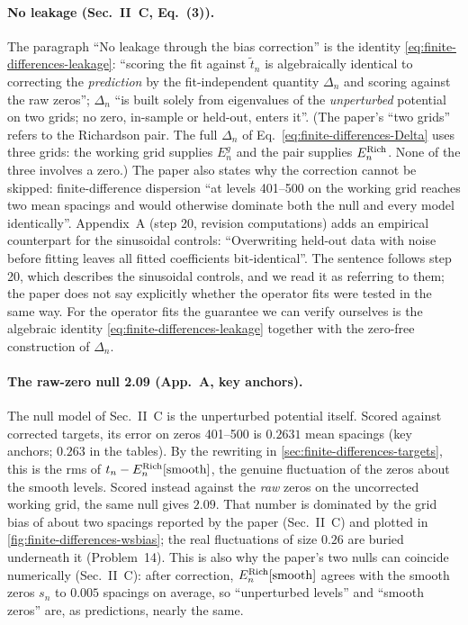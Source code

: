 \paragraph{No leakage (Sec.~II~C, Eq.~(3)).} The paragraph ``No leakage through the bias correction'' is the identity \eqref{eq:finite-differences-leakage}: ``scoring the fit against $\tilde t_n$ is algebraically identical to correcting the \emph{prediction} by the fit-independent quantity $\Delta_n$ and scoring against the raw zeros''; $\Delta_n$ ``is built solely from eigenvalues of the \emph{unperturbed} potential on two grids; no zero, in-sample or held-out, enters it''. (The paper's ``two grids'' refers to the Richardson pair. The full $\Delta_n$ of Eq.~\eqref{eq:finite-differences-Delta} uses three grids: the working grid supplies $E^g_n$ and the pair supplies $E^{\rm Rich}_n$. None of the three involves a zero.) The paper also states why the correction cannot be skipped: finite-difference dispersion ``at levels 401--500 on the working grid reaches two mean spacings and would otherwise dominate both the null and every model identically''. Appendix~A (step 20, revision computations) adds an empirical counterpart for the sinusoidal controls: ``Overwriting held-out data with noise before fitting leaves all fitted coefficients bit-identical''. The sentence follows step 20, which describes the sinusoidal controls, and we read it as referring to them; the paper does not say explicitly whether the operator fits were tested in the same way. For the operator fits the guarantee we can verify ourselves is the algebraic identity \eqref{eq:finite-differences-leakage} together with the zero-free construction of $\Delta_n$.

\paragraph{The raw-zero null 2.09 (App.~A, key anchors).} The null model of Sec.~II~C is the unperturbed potential itself. Scored against corrected targets, its error on zeros 401--500 is $0.2631$ mean spacings (key anchors; $0.263$ in the tables). By the rewriting in \cref{sec:finite-differences-targets}, this is the rms of $t_n-E_n^{\rm Rich}[\mathrm{smooth}]$, the genuine fluctuation of the zeros about the smooth levels. Scored instead against the \emph{raw} zeros on the uncorrected working grid, the same null gives $2.09$. That number is dominated by the grid bias of about two spacings reported by the paper (Sec.~II~C) and plotted in \cref{fig:finite-differences-wsbias}; the real fluctuations of size $0.26$ are buried underneath it (Problem~14). This is also why the paper's two nulls can coincide numerically (Sec.~II~C): after correction, $E_n^{\rm Rich}[\mathrm{smooth}]$ agrees with the smooth zeros $s_n$ to $0.005$ spacings on average, so ``unperturbed levels'' and ``smooth zeros'' are, as predictions, nearly the same.

